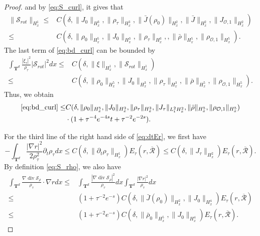 \documentclass[english]{amsart}
\theoremstyle{plain}
\theoremstyle{definition}
\theoremstyle{remark}
\theoremstyle{plain}
\theoremstyle{plain}
\theoremstyle{plain}
\def\T{{\mathbf T}}%
\def\d{{\partial}}
\DeclareMathOperator{\diver}{div}
\numberwithin{equation}{section}
\begin{document}
\begin{proof}
and by \eqref{eq:S_curl}, it gives that
\begin{align*}
\|\mathcal{S}_{rot}\|_{H^1_x}\leq & C(\delta,\|J_0\|_{H^3_x},\|\rho_\tau\|_{H^3_x},\|\bar J(\rho_0)\|_{H^2_x},\|\bar J\|_{H^2_x},\|J_{\mathcal{O},1}\|_{H^2_x})\\
\leq & C(\delta,\|\rho_0\|_{H^5_x},\|J_0\|_{H^3_x},\|\rho_\tau\|_{H^3_x},,\|\bar\rho\|_{H^5_x},\|\rho_{\mathcal{O},1}\|_{H^5_x}).
\end{align*}
The last term of \eqref{eq:bd_curl} can be bounded by
\begin{align*}
\int_{\T^d}\frac{|\xi_\tau|^2}{\rho_\tau}|\mathcal{S}_{rot}|^2dx\leq &C(\delta,\|\xi\|_{H^1_x},\|\mathcal{S}_{rot}\|_{H^1_x})\\
\leq & C(\delta,\|\rho_0\|_{H^5_x},\|J_0\|_{H^3_x},\|\rho_\tau\|_{H^3_x},\|\bar\rho\|_{H^5_x},\|\rho_{\mathcal{O},1}\|_{H^5_x}).
\end{align*}
Thus, we obtain 
\begin{equation}\label{eq:estS_3}
\begin{aligned}
\eqref{eq:bd_curl}\leq & C(\delta,\|\rho_0\|_{H^5_x},\|J_0\|_{H^3_x},\|\rho_\tau\|_{H^3_x},\|J_\tau\|_{L^2_tH^2_x},\|\bar\rho\|_{H^5_x},\|\rho_{\mathcal{O},1}\|_{H^5_x})\\
&\cdot (1+\tau^{-4}e^{-4s}t+\tau^{-2}e^{-2s}).
\end{aligned}
\end{equation}

For the third line of the right hand side of \eqref{eq:dtEr}, we first have
\begin{equation}\label{eq:estS_4}
-\int_{\T^d}\frac{|\nabla r|^2}{2\rho_\tau^2}\d_t\rho_\tau dx\leq C(\delta,\|\d_t \rho_\tau\|_{H^1_x})E_\tau(r,\overline{\mathcal{R}})\leq C(\delta,\|J_\tau\|_{H^2_x})E_\tau(r,\overline{\mathcal{R}}).
\end{equation}
By definition \eqref{eq:S_rho}, we also have
\begin{equation}\label{eq:estS_5}
\begin{aligned}
\int_{\T^d} \frac{\nabla\diver \mathcal{S}_\rho}{\rho_\tau}\cdot\nabla rdx\leq & \int_{\T^d} \frac{|\nabla\diver \mathcal{S}_\rho|^2}{\rho_\tau}dx\int_{\T^d}\frac{|\nabla r|^2}{\rho_\tau}dx\\
\leq & (1+\tau^{-2}e^{-s})C(\delta,\|\bar J(\rho_0)\|_{H^2_x},\|J_0\|_{H^4_x})E_\tau(r,\overline{\mathcal{R}})\\
\leq & (1+\tau^{-2}e^{-s})C(\delta,\|\bar \rho_0\|_{H^5_x},\|J_0\|_{H^4_x})E_\tau(r,\overline{\mathcal{R}}).
\end{aligned}
\end{equation}


\end{proof}
\end{document}
